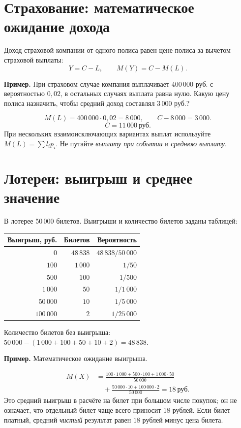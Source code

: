 \documentclass[a4paper,12pt]{article}
\newcommand{\key}[1]{\textcolor{darkaccent}{#1}}
\newcommand{\Ex}[1]{\par\medskip\noindent\textcolor{darkaccent}{\textbf{Пример.}} #1\par\smallskip}
\begin{document}
\section{Страхование: математическое ожидание дохода}
Доход страховой компании от одного полиса равен цене полиса за вычетом страховой выплаты:
\[
Y=C-L,\qquad M(Y)=C-M(L).
\]
\Ex{При страховом случае компания выплачивает $400\,000$ руб. с вероятностью $0{,}02$, в остальных случаях выплата равна нулю. Какую цену полиса назначить, чтобы средний доход составлял $3\,000$ руб.?}
\[
M(L)=400\,000\cdot0{,}02=8\,000,\qquad
C-8\,000=3\,000.
\]
\[\boxed{C=11\,000\ \text{руб.}}\]
При нескольких взаимоисключающих вариантах выплат используйте $M(L)=\sum l_ip_i$. Не путайте \emph{выплату при событии} и \emph{среднюю выплату}.


\clearpage
{}\section{Лотереи: выигрыш и среднее значение}
В лотерее 50\,000 билетов. Выигрыши и количество билетов заданы таблицей:
\begin{center}
\small\renewcommand{\arraystretch}{1.2}
\begin{tabular}{@{}r r r@{}}
\toprule
Выигрыш, руб. & Билетов & Вероятность \\
\midrule
$0$ & $48\,838$ & $48\,838/50\,000$ \\
$100$ & $1\,000$ & $1/50$ \\
$500$ & $100$ & $1/500$ \\
$1\,000$ & $50$ & $1/1\,000$ \\
$50\,000$ & $10$ & $1/5\,000$ \\
$100\,000$ & $2$ & $1/25\,000$ \\
\bottomrule
\end{tabular}
\end{center}
Количество билетов без выигрыша: $50\,000-(1\,000+100+50+10+2)=48\,838$.

\Ex{Математическое ожидание выигрыша.}
\[
\begin{aligned}
M(X)&=\frac{100\cdot1\,000+500\cdot100+1\,000\cdot50}{50\,000}\\
&\quad+\frac{50\,000\cdot10+100\,000\cdot2}{50\,000}
=\boxed{18\ \text{руб.}}
\end{aligned}
\]
Это \key{средний выигрыш в расчёте на билет} при большом числе покупок; он не означает, что отдельный билет чаще всего приносит 18 рублей. Если билет платный, средний \emph{чистый} результат равен $18$ рублей минус цена билета.
\end{document}
